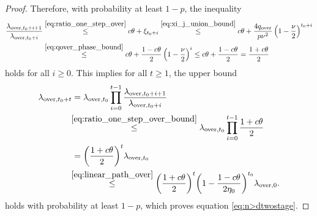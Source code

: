 \documentclass[11pt]{article}
\theoremstyle{plain}
\theoremstyle{definition}
\theoremstyle{remark}
\theoremstyle{plain}
\begin{document}
\begin{proof}
Therefore, with probability at least $1-p$, the inequality
\begin{align}\label{eq:ratio_one_step_over_bound}
\begin{split}    
\frac{\lambda_{\mathrm{over},t_0+i+1}}
{\lambda_{\mathrm{over},t_0+i}}
& \overset{\eqref{eq:ratio_one_step_over}}{\leq}
c\theta + \xi_{t_0+i}
\overset{\eqref{eq:xi_j_union_bound}}{\leq}
c\theta + \frac{4q_{\text{\rm over}}}{p\nu^2}
\left(1-\frac{\nu}{2}\right)^{t_0+i} \\
& \overset{\eqref{eq:qover_phase_bound}}{\leq}
c\theta +  \frac{1-c\theta}{2}\left(1-\frac{\nu}{2}\right)^i
\leq c\theta +  \frac{1-c\theta}{2} = \frac{1+c\theta}{2}
\end{split}
\end{align}
holds for all $i\geq 0$.
This implies for all $t\geq1$, the upper bound
\begin{align*}
\lambda_{\mathrm{over},t_0+t}
&=\lambda_{\mathrm{over},t_0}
\prod_{i=0}^{t-1}
\frac{\lambda_{\mathrm{over},t_0+i+1}}
{\lambda_{\mathrm{over},t_0+i}}\\
&\!\!\overset{\eqref{eq:ratio_one_step_over_bound}}{\leq}\lambda_{\mathrm{over},t_0}
\prod_{i=0}^{t-1}\frac{1+c\theta}{2}\\
&=\biggl(\frac{1+c\theta}{2}\biggr)^t
\lambda_{\mathrm{over},t_0}\\
&\!\!\overset{\eqref{eq:linear_path_over}}{\leq}
\biggl(\frac{1+c\theta}{2}\biggr)^t
\biggl(1-\frac{1-c\theta}{2\eta_0}\biggr)^{t_0}
\lambda_{\mathrm{over},0}.
\end{align*}
holds with probability at least $1-p$, which proves equation \eqref{eq:n>dtwostage}.
\end{proof}
\end{document}
